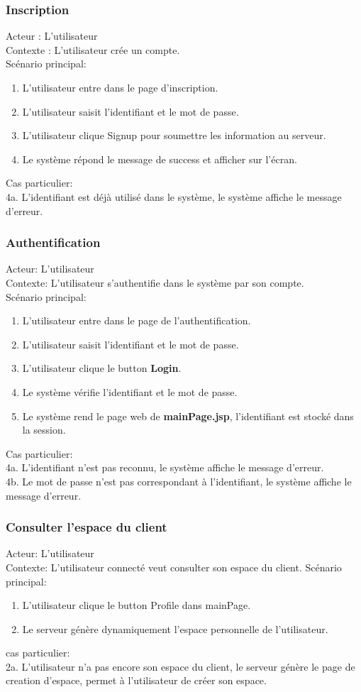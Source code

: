 \documentclass[14px]{article}
\begin{document}
\subsubsection{Inscription}
Acteur : L'utilisateur\\
Contexte : L'utilisateur crée un compte.\\
Scénario principal:
\begin{enumerate}
	\item L'utilisateur entre dans le page d'inscription.
	\item L'utilisateur saisit l'identifiant et le mot de passe.
	\item L'utilisateur clique Signup pour soumettre les information au serveur.
	\item Le système répond le message de success et afficher sur l'écran.
\end{enumerate}
Cas particulier:\\
4a. L'identifiant est déjà utilisé dans le système, le système affiche le message d'erreur.

\subsubsection{Authentification}
Acteur: L'utilisateur\\
Contexte: L'utilisateur s'authentifie dans le système par son compte.\\
Scénario principal:
\begin{enumerate}
	\item L'utilisateur entre dans le page de l'authentification.
	\item L'utilisateur saisit l'identifiant et le mot de passe.
	\item L'utilisateur clique le button \textbf{Login}.
	\item Le système vérifie l'identifiant et le mot de passe.
	\item Le système rend le page web de \textbf{mainPage.jsp}, l'identifiant est stocké dans la session.
\end{enumerate}
Cas particulier: \\
4a. L'identifiant n'est pas reconnu, le système affiche le message d'erreur.\\
4b. Le mot de passe n'est pas correspondant à l'identifiant, le système affiche le message d'erreur.

\subsubsection{Consulter l'espace du client}
Acteur: L'utilisateur\\
Contexte: L'utilisateur connecté veut consulter son espace du client.
Scénario principal:
\begin{enumerate}
	\item L'utilisateur clique le button Profile dans mainPage.
	\item Le serveur génère dynamiquement l'espace personnelle de l'utilisateur.
\end{enumerate}
cas particulier:\\
2a. L'utilisateur n'a pas encore son espace du client, le serveur génère le page de creation d'espace, permet à l'utilisateur de créer son espace.
\end{document}
